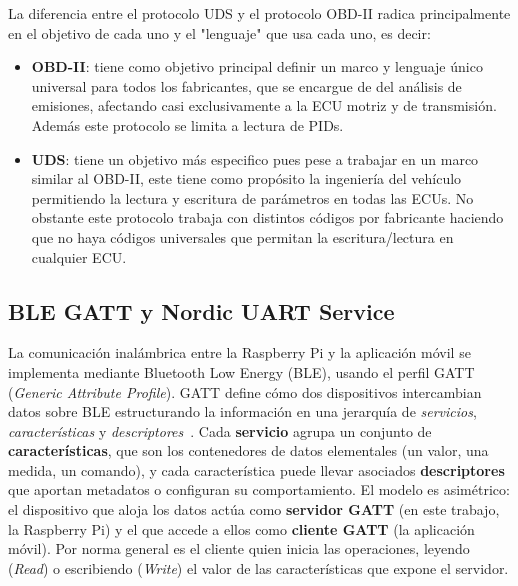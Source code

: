 La diferencia entre el protocolo UDS y el protocolo OBD-II radica principalmente en el objetivo de cada uno y el "lenguaje" que usa cada uno, es decir:
\begin{itemize}
    \item \textbf{OBD-II}: tiene como objetivo principal definir un marco y lenguaje único universal para todos los fabricantes, que se encargue de del análisis de emisiones, afectando casi exclusivamente a la ECU motriz y de transmisión. Además este protocolo se limita a lectura de PIDs.
    \item \textbf{UDS}: tiene un objetivo más especifico pues pese a trabajar en un marco similar al OBD-II, este tiene como propósito la ingeniería del vehículo permitiendo la lectura y escritura de parámetros en todas las ECUs. No obstante este protocolo trabaja con distintos códigos por fabricante haciendo que no haya códigos universales que permitan la escritura/lectura en cualquier ECU.
\end{itemize} 

\subsection{BLE GATT y Nordic UART Service}
\label{sec:proto_ble}

La comunicación inalámbrica entre la Raspberry Pi y la aplicación móvil se implementa mediante Bluetooth Low Energy (BLE), usando el perfil GATT (\textit{Generic Attribute Profile}). GATT define cómo dos dispositivos intercambian datos sobre BLE estructurando la información en una jerarquía de \textit{servicios}, \textit{características} y \textit{descriptores}~\cite{Bluetooth_CoreSpec}. Cada \textbf{servicio} agrupa un conjunto de \textbf{características}, que son los contenedores de datos elementales (un valor, una medida, un comando), y cada característica puede llevar asociados \textbf{descriptores} que aportan metadatos o configuran su comportamiento. El modelo es asimétrico: el dispositivo que aloja los datos actúa como \textbf{servidor GATT} (en este trabajo, la Raspberry Pi) y el que accede a ellos como \textbf{cliente GATT} (la aplicación móvil). Por norma general es el cliente quien inicia las operaciones, leyendo (\textit{Read}) o escribiendo (\textit{Write}) el valor de las características que expone el servidor.

